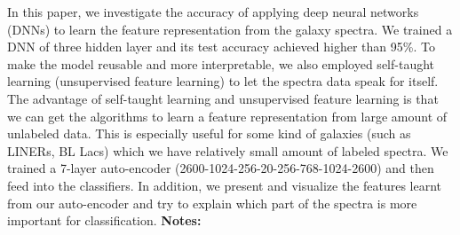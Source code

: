 \documentclass{report}
\begin{document}
{{{{{{{{{{{{{{{{{{{{{{{{{{{{{{{{{{{{{{{{{{{{{{{{{{{{{{{{{{{{{{{{{{{{{{{{{{{{{{{{{{{{{{{{{{{{{{{{{{{{{{{{{{{{{{{{{{{{{{{{{{{{{{{{{{{{{{{{{{{{{{{{{{{{{{{{{{{{{{{{{{{{{{{{{{{{{{{{{{{{{{{{{{{In this paper, we investigate the accuracy of applying deep neural networks (DNNs) to learn the feature representation from the galaxy spectra. We trained a DNN of three hidden layer and its test accuracy achieved higher than 95\%. To make the model reusable and more interpretable, we also employed self-taught learning (unsupervised feature learning) to let the spectra data speak for itself. The advantage of self-taught learning and unsupervised feature learning is that we can get the algorithms to learn a feature representation from large amount of unlabeled data. This is especially useful for some kind of galaxies (such as LINERs, BL Lacs) which we have relatively small amount of labeled spectra. We trained a 7-layer auto-encoder (2600-1024-256-20-256-768-1024-2600) and then feed into the classifiers.  In addition, we present and visualize the features learnt from our auto-encoder and try to explain which part of the spectra is more important for classification.\newline
{\bf Notes:}\newline
{\newpage
}}}}}}}}}}}}}}}}}}}}}}}}}}}}}}}}}}}}}}}}}}}}}}}}}}}}}}}}}}}}}}}}}}}}}}}}}}}}}}}}}}}}}}}}}}}}}}}}}}}}}}}}}}}}}}}}}}}}}}}}}}}}}}}}}}}}}}}}}}}}}}}}}}}}}}}}}}}}}}}}}}}}}}}}}}}}}}}}}}}}}}}}}}}}
\end{document}
